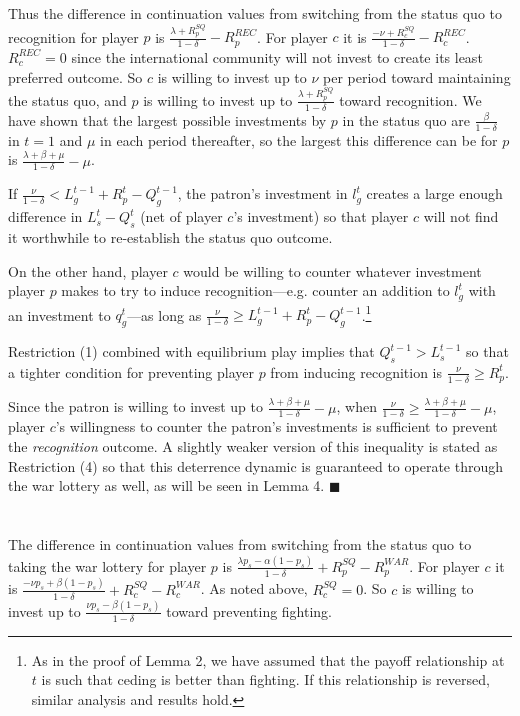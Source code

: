 \documentclass[11pt,letterpaper, notitlepage]{article}
\newcommand{\de}{\delta}
\begin{document}
Thus the difference in continuation values from switching from the status quo to recognition for player $p$ is $\frac{\lambda +R_p^{SQ}}{1 -\de} -R_p^{REC}$. For player $c$ it is $\frac{-\nu + R_c^{SQ}}{1 -\de}-R_c^{REC}$. $R_c^{REC} =0$ since the international community will not invest to create its least preferred outcome. So $c$ is willing to invest up to $\nu$ per period toward maintaining the status quo, and $p$ is willing to invest up to $\frac{\lambda +R_p^{SQ}}{1 -\de}$ toward recognition. We have shown that the largest possible investments by $p$ in the status quo are $\frac{\beta}{1 -\de}$ in $t=1$ and $\mu$ in each period thereafter, so the largest this difference can be for $p$ is $\frac{\lambda + \beta + \mu}{1 -\de} -\mu$.

If $\frac{\nu}{1-\de} < L_g^{t-1} + R_p^t - Q_g^{t-1}$, the patron's investment in $l_g^t$ creates a large enough difference in $L_s^t - Q_s^t$ (net of player $c$'s investment) so that player $c$ will not find it worthwhile to re-establish the status quo outcome.

On the other hand, player $c$ would be willing to counter whatever investment player $p$ makes to try to induce recognition---e.g. counter an addition to $l_g^t$ with an investment to $q_g^t$---as long as $\frac{\nu}{1-\de} \geq L_g^{t-1} + R_p^t - Q_g^{t-1}$.\footnote{As in the proof of Lemma 2, we have assumed that the payoff relationship at $t$ is such that ceding is better than fighting. If this relationship is reversed, similar analysis and results hold.}

Restriction (1) combined with equilibrium play implies that  $Q_s^{t-1} > L_s^{t-1}$ so that a tighter condition for preventing player $p$ from inducing recognition is $\frac{\nu}{1 -\de} \geq R_p^t$. 

Since the patron is willing to invest up to $\frac{\lambda + \beta + \mu}{1 -\de} -\mu$, when $\frac{\nu}{1 -\de} \geq \frac{\lambda + \beta + \mu}{1 -\de} -\mu$, player $c$'s willingness to counter the patron's investments is sufficient to prevent the \emph{recognition} outcome. A slightly weaker version of this inequality is stated as Restriction (4) so that this deterrence dynamic is guaranteed to operate through the war lottery as well, as will be seen in Lemma 4. \hfill $\blacksquare$
\\
\\
 \\
The difference in continuation values from switching from the status quo to taking the war lottery for player $p$ is $\frac{\lambda p_s - \alpha (1-p_s)}{1 -\de} +R_p^{SQ} -R_p^{WAR}$. For player $c$ it is $\frac{-\nu p_s + \beta (1-p_s)}{1 -\de} + R_c^{SQ} -R_c^{WAR}$. As noted above, $R_c^{SQ} =0$. So $c$ is willing to invest up to $\frac{\nu p_s - \beta (1-p_s)}{1 -\de}$ toward preventing fighting.
\end{document}
